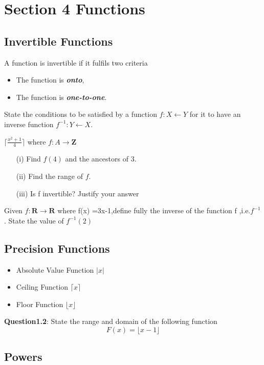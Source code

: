 \documentclass[12pt]{article}
\begin{document}
\section{Section 4 Functions}

\subsection{Invertible Functions}
A function is invertible if it fulfils two criteria
\begin{itemize}
\item The function is \textbf{\textit{onto}},
\item The function is \textbf{\textit{one-to-one}}.
\end{itemize}

State the conditions to be satisfied by a function
$f : X \leftarrow Y$ for it to have an inverse function
$f^{-1} : Y \leftarrow X$.

$\lceil \frac{x^2+1}{4} \rceil$
where $f : A \rightarrow \textbf{Z}$
\begin{itemize}
\item[(i)] Find $f(4)$ and the ancestors of 3.
\item[(ii)] Find the range of $f$.
\item[(iii)] Is f invertible? Justify your answer
\end{itemize}

Given $f : \textbf{R} \rightarrow \textbf{R}$ where f(x) =3x-1,define fully
the inverse of the function f ,i.e.$f^{-1}$. 
State the value of $f^{-1}(2)$
\subsection{Precision Functions}

\begin{itemize}
\item Absolute Value Function $| x |$
\item Ceiling Function $\lceil x \rceil$
\item Floor Function  $\lfloor x \rfloor $
\end{itemize}

\noindent \textbf{Question1.2}: State the range and domain of the following function
\[ F(x) = \lfloor x-1 \rfloor \]
\subsection{Powers}
\end{document}
